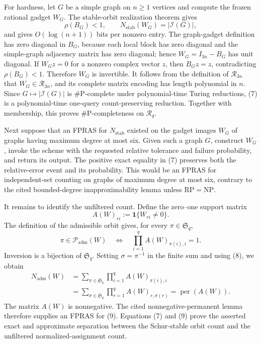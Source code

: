 For hardness, let \(G\) be a simple graph on \(n\geq1\) vertices and compute the frozen rational gadget \(W_G\). The stable-orbit realization theorem gives
\[
 \rho(B_G)<1,
 \qquad
 N_{\mathrm{stab}}(W_G)=|\mathcal I(G)|, \tag{7}
\]
and gives \(O(\log(n+1))\) bits per nonzero entry. The graph-gadget definition has zero diagonal in \(B_G\), because each local block has zero diagonal and the simple-graph adjacency matrix has zero diagonal; hence \(W_G=I_{3n}-B_G\) has unit diagonal. If \(W_Gz=0\) for a nonzero complex vector \(z\), then \(B_Gz=z\), contradicting \(\rho(B_G)<1\). Therefore \(W_G\) is invertible. It follows from the definition of \(\mathcal R_{3n}\) that \(W_G\in\mathcal R_{3n}\), and its complete matrix encoding has length polynomial in \(n\). Since \(G\mapsto|\mathcal I(G)|\) is \(\#\mathrm P\)-complete under polynomial-time Turing reductions, (7) is a polynomial-time one-query count-preserving reduction. Together with membership, this proves \(\#\mathrm P\)-completeness on \(\mathcal R_q\).

Next suppose that an FPRAS for \(N_{\mathrm{stab}}\) existed on the gadget images \(W_G\) of graphs having maximum degree at most six. Given such a graph \(G\), construct \(W_G\), invoke the scheme with the requested relative tolerance and failure probability, and return its output. The positive exact equality in (7) preserves both the relative-error event and its probability. This would be an FPRAS for independent-set counting on graphs of maximum degree at most six, contrary to the cited bounded-degree inapproximability lemma unless \(\mathrm{RP}=\mathrm{NP}\).

It remains to identify the unfiltered count. Define the zero--one support matrix
\[
 A(W)_{ri}:=\mathbf 1\{W_{ri}\neq0\}.
\]
The definition of the admissible orbit gives, for every \(\pi\in\mathfrak S_q\),
\[
 \pi\in\mathcal P_{\mathrm{adm}}(W)
 \quad\Longleftrightarrow\quad
 \prod_{i=1}^q A(W)_{\pi(i),i}=1. \tag{8}
\]
Inversion is a bijection of \(\mathfrak S_q\). Setting \(\sigma=\pi^{-1}\) in the finite sum and using (8), we obtain
\[
\begin{aligned}
 N_{\mathrm{adm}}(W)
 &=\sum_{\pi\in\mathfrak S_q}
   \prod_{i=1}^q A(W)_{\pi(i),i}\\
 &=\sum_{\sigma\in\mathfrak S_q}
   \prod_{r=1}^q A(W)_{r,\sigma(r)}
 =\operatorname{per}(A(W)).
\end{aligned} \tag{9}
\]
The matrix \(A(W)\) is nonnegative. The cited nonnegative-permanent lemma therefore supplies an FPRAS for (9). Equations (7) and (9) prove the asserted exact and approximate separation between the Schur-stable orbit count and the unfiltered normalized-assignment count.

